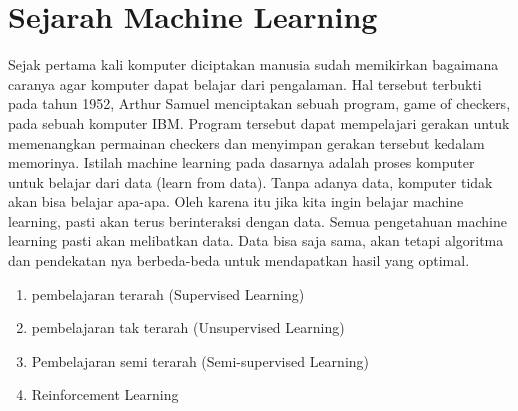 \section{Sejarah Machine Learning}
Sejak pertama kali komputer diciptakan manusia sudah memikirkan bagaimana caranya agar komputer dapat belajar dari pengalaman. Hal tersebut terbukti pada tahun 1952, Arthur Samuel menciptakan 
sebuah program, game of checkers, pada sebuah komputer IBM. Program tersebut dapat mempelajari gerakan untuk memenangkan permainan checkers dan menyimpan gerakan tersebut kedalam memorinya.
Istilah machine learning pada dasarnya adalah proses komputer untuk belajar dari data (learn from data). Tanpa adanya data, komputer tidak akan bisa belajar apa-apa. Oleh karena itu jika kita ingin belajar machine learning, pasti akan terus berinteraksi dengan data. Semua pengetahuan machine learning pasti akan melibatkan data. Data bisa saja sama, akan tetapi algoritma dan pendekatan nya berbeda-beda untuk mendapatkan hasil yang optimal.
\begin{enumerate}
	\item pembelajaran terarah (Supervised Learning)
	\item pembelajaran tak terarah (Unsupervised Learning)
	\item Pembelajaran semi terarah (Semi-supervised Learning)
	\item Reinforcement Learning
\end{enumerate}
